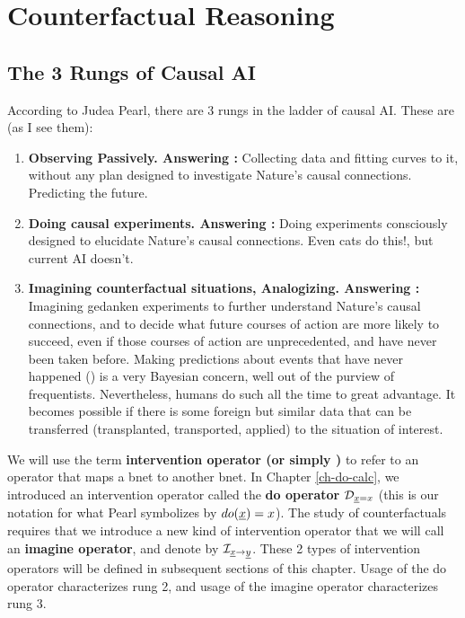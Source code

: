 \chapter{Counterfactual Reasoning}
\label{ch-counterf}


\section{The 3 Rungs of Causal AI}
According to
Judea Pearl,
there are 3 rungs in the
ladder of causal AI.
These are (as I see them):
\begin{enumerate}
\item
{\bf Observing Passively. Answering :} Collecting
data
and fitting curves to it,
without any plan
designed to
investigate Nature's
causal connections. Predicting the future.
\item {\bf Doing causal
experiments. Answering :}
Doing experiments
consciously designed to
elucidate
Nature's causal connections.
Even cats do this!, but current AI doesn't.
\item {\bf Imagining
 counterfactual situations, Analogizing. Answering :}
Imagining gedanken experiments
to further understand
Nature's causal connections,
and to decide what future
courses of action are
more likely to succeed,
even if
those courses of action
are unprecedented, and have never been taken before.
Making
predictions about
 events that have never happened ()
is a very Bayesian
concern, well out of the purview of
frequentists. Nevertheless,
humans do such
all the time to great advantage.
It becomes
possible if there
is some foreign but similar
data that can be transferred
(transplanted, transported, applied)
to the situation of
interest.


\end{enumerate}

We will use the
term {\bf intervention operator (or simply )}
to refer to an operator
that maps a bnet to another bnet.
In Chapter \ref{ch-do-calc},
we introduced an intervention operator
 called the {\bf do operator}
$\cald_{\rvx=x}$ (this is our notation for what Pearl
symbolizes by $do(\rvx)=x$).
The study of counterfactuals
requires that we
introduce a new
kind of intervention
operator that we will
call an {\bf imagine operator},
and denote by
$\cali_{\rvx\rarrow\rvy}$.
These 2 types of intervention
operators
will be defined
in subsequent sections of this chapter.
Usage of the do operator 
characterizes rung 2, and usage of 
the imagine operator characterizes
rung 3.


